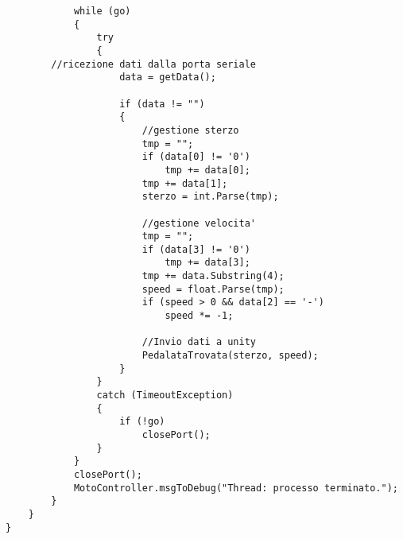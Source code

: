 \begin{lstlisting}
            while (go)
            {
                try
                {
		//ricezione dati dalla porta seriale
                    data = getData();
                    
                    if (data != "")
                    {
                        //gestione sterzo
                        tmp = "";
                        if (data[0] != '0')
                            tmp += data[0];
                        tmp += data[1];
                        sterzo = int.Parse(tmp);

                        //gestione velocita'
                        tmp = "";
                        if (data[3] != '0')
                            tmp += data[3];
                        tmp += data.Substring(4);
                        speed = float.Parse(tmp);
                        if (speed > 0 && data[2] == '-')
                            speed *= -1;

                        //Invio dati a unity
                        PedalataTrovata(sterzo, speed);
                    }
                }
                catch (TimeoutException)
                {
                    if (!go)
                        closePort();
                }
            }
            closePort();
            MotoController.msgToDebug("Thread: processo terminato.");
        }
    }
}

\end{lstlisting}
